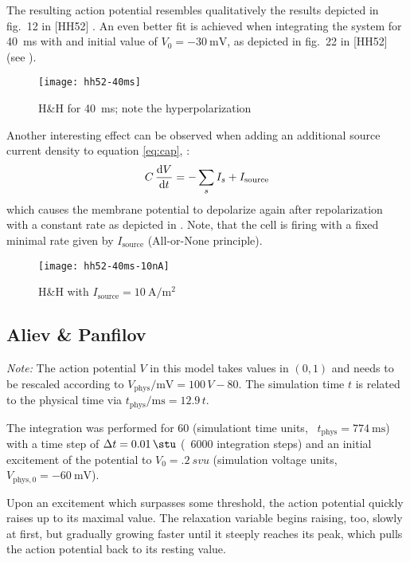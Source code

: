 The resulting action potential resembles qualitatively the results depicted in
fig.~12 in [HH52] . An even
better fit is achieved when integrating the system for \SI{40}{\milli\second}
with and initial value of $V_0=\SI{-30}{\milli\volt}$, as depicted in fig.~22
in [HH52] (see ).

\begin{figure}[h]
    \centering
    \texttt{[image: hh52-40ms]}
    \label{fig:hh2}
    \caption{H\&H for \SI{40}{\milli\second}; note the hyperpolarization}
\end{figure}

Another interesting effect can be observed when adding an additional source
current density to equation \eqref{eq:cap}, \ie:
\begin{equation*}
    C\,\dv{V}{t}=-\sum_{s}I_{s} + I_{\mathrm{source}}
\end{equation*}
which causes the membrane potential to depolarize again after repolarization
with a constant rate as depicted in . Note, that the cell is
firing with a fixed minimal rate given by $I_{\mathrm{source}}$ (All-or-None
principle).

\begin{figure}[h]
    \centering
    \texttt{[image: hh52-40ms-10nA]}
    \label{fig:hh3}
    \caption{H\&H with
        $I_{\mathrm{source}}=\SI{10}{\ampere\per\metre\squared}$}
\end{figure}


\subsection{Aliev \& Panfilov}
\emph{Note:} The action potential $V$ in this model takes values in $(0,1)$ and
needs to be rescaled according to
$V_{\mathrm{phys}}/\si{\milli\volt}=100\,V-80$. The simulation time $t$ is related
to the physical time via $t_{\mathrm{phys}}/\si{\milli\second}=12.9\,t$.

\vspace{\baselineskip}
The integration was performed for \SI{60}{\stu} (simulationt time units,
\ie~$t_{\mathrm{phys}}=\SI{774}{\milli\second}$) with a time step of
$\Delta{t}=\SI{.01}{\stu}$ (\ie~6000 integration steps) and an initial
excitement of the potential to $V_0=\SI{.2}{svu}$ (simulation voltage
units, \ie~$V_{\mathrm{phys},0}=\SI{-60}{\milli\volt}$).

Upon an excitement which surpasses some threshold, the action potential quickly
raises up to its maximal value. The relaxation variable begins raising, too,
slowly at first, but gradually growing faster until it steeply reaches its
peak, which pulls the action potential back to its resting value.

